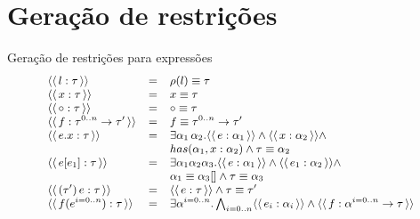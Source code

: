 \documentclass{beamer}
\newcommand{\constr}[1]{\ensuremath{\langle\langle\,#1\,\rangle\rangle}}
\begin{document}
   \section{Geração de restrições}
   \begin{frame}{Geração de restrições para expressões}
       \[\small{
            \begin{array}{lcl}
                \constr{l : \tau} & = & \rho(l) \equiv \tau\\
                \constr{x : \tau} & = & x \equiv \tau \\
                \constr{\circ : \tau} & = & \circ \equiv \tau \\
                \constr{f : \tau^{0..n}\to \tau'} & = & f \equiv
                                                        \tau^{0..n}\to
                                                        \tau' \\
                \constr{e.x : \tau} & = & \exists
                                          \alpha_1\,\alpha_2. \constr{e
                                          : \alpha_1} \land \constr{x
                                          : \alpha_2} \land \\
                          & & has(\alpha_1,x:\alpha_2) \land \tau
                              \equiv \alpha_2\\
                \constr{e[e_1] : \tau} & = & \exists
                                         \alpha_1\alpha_2\alpha_3. \constr{e:\alpha_1}
                                             \land\constr{e_1:\alpha_2}\land\\
                         & & \alpha_1\equiv\alpha_3[]\land \tau \equiv
                             \alpha_3\\
                \constr{(\tau')\,e:\tau} & = & \constr{e : \tau} \land
                                               \tau \equiv \tau'\\
                \constr{f(e^{i=0..n}) : \tau} & = & \exists
                                                    \alpha^{i=0..n}. \bigwedge_{i=0..n}\constr{e_i:\alpha_i}
                                                    \land \constr{f :
                                                    \alpha^{i=0..n}
                                                    \to \tau} 
            \end{array}}
       \]
   \end{frame}
\end{document}
